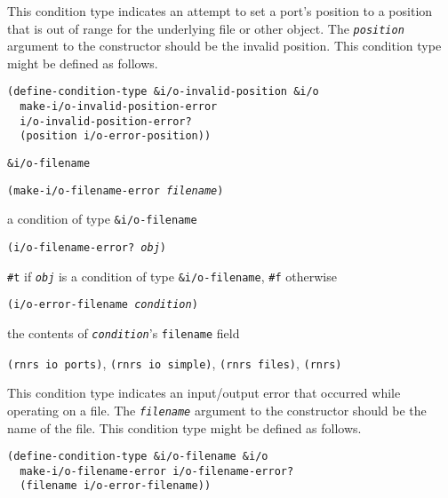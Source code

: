 This condition type indicates an attempt to set a port's position to a
position that is out of range for the underlying file or other object.
The \texttt{\textit{position}} argument to the constructor
should be the invalid position.
This condition type might be defined as follows.

\begin{alltt}
(define-condition-type \&{}i/o-invalid-position \&{}i/o
  make-i/o-invalid-position-error
  i/o-invalid-position-error?
  (position i/o-error-position))
\end{alltt}

\begin{description}

\label{exceptions_s36}\item[syntax] \texttt{\&{}i/o-filename}



\item[procedure] \texttt{(make-i/o-filename-error \textit{filename})}



\item[returns] a condition of type \texttt{\&{}i/o-filename}


\item[procedure] \texttt{(i/o-filename-error? \textit{obj})}



\item[returns] \texttt{\#{}t} if \texttt{\textit{obj}} is a condition of type \texttt{\&{}i/o-filename}, \texttt{\#{}f} otherwise


\item[procedure] \texttt{(i/o-error-filename \textit{condition})}



\item[returns] the contents of \texttt{\textit{condition}}'s \texttt{filename} field


\item[libraries] \texttt{(rnrs io ports)}, \texttt{(rnrs io simple)}, \texttt{(rnrs files)}, \texttt{(rnrs)}
\end{description}



This condition type indicates an input/output error that occurred
while operating on a file.
The \texttt{\textit{filename}} argument to the constructor should
be the name of the file.
This condition type might be defined as follows.

\begin{alltt}
(define-condition-type \&{}i/o-filename \&{}i/o
  make-i/o-filename-error i/o-filename-error?
  (filename i/o-error-filename))
\end{alltt}

